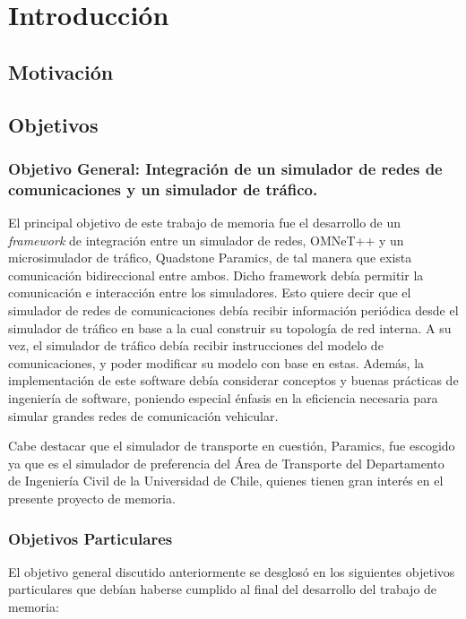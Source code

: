 \chapter{Introducción}
\section{Motivación}


\section{Objetivos}

\subsection{Objetivo General: Integración de un simulador de redes de comunicaciones y un simulador de tráfico.}

El principal objetivo de este trabajo de memoria fue el desarrollo de un \textit{framework} de integración entre un simulador de redes, OMNeT++ y un microsimulador de tráfico, Quadstone Paramics, de tal manera que exista comunicación bidireccional entre ambos. Dicho framework debía permitir la comunicación e interacción entre los simuladores. Esto quiere decir que el simulador de redes de comunicaciones debía recibir información periódica desde el simulador de tráfico en base a la cual construir su topología de red interna. A su vez, el simulador de tráfico debía recibir instrucciones del modelo de comunicaciones, y poder modificar su modelo con base en estas.
Además, la implementación de este software debía considerar conceptos y buenas prácticas de ingeniería de software, poniendo especial énfasis en la eficiencia necesaria para simular grandes redes de comunicación vehicular.

Cabe destacar que el simulador de transporte en cuestión, Paramics, fue escogido ya que es el simulador de preferencia del Área de Transporte del Departamento de Ingeniería Civil de la Universidad de Chile, quienes tienen gran interés en el presente proyecto de memoria.


\subsection{Objetivos Particulares}\label{sec:obj:part}

El objetivo general discutido anteriormente se desglosó en los siguientes objetivos particulares que debían haberse cumplido al final del desarrollo del trabajo de memoria:

